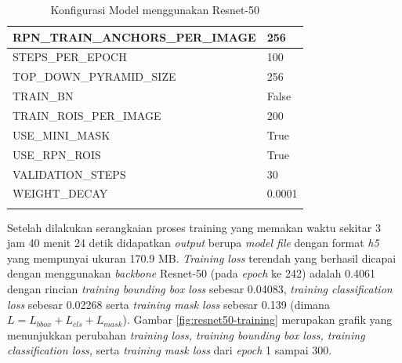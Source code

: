 \begin{longtable}[h]{|l|l|}
		RPN\_TRAIN\_ANCHORS\_PER\_IMAGE & 256                                                                                                                                                                                    \\ \hline
		STEPS\_PER\_EPOCH               & 100                                                                                                                                                                                    \\ \hline
		TOP\_DOWN\_PYRAMID\_SIZE        & 256                                                                                                                                                                                    \\ \hline
		TRAIN\_BN                       & False                                                                                                                                                                                  \\ \hline
		TRAIN\_ROIS\_PER\_IMAGE         & 200                                                                                                                                                                                    \\ \hline
		USE\_MINI\_MASK                 & True                                                                                                                                                                                   \\ \hline
		USE\_RPN\_ROIS                  & True                                                                                                                                                                                   \\ \hline
		VALIDATION\_STEPS               & 30                                                                                                                                                                                     \\ \hline
		WEIGHT\_DECAY                   & 0.0001  
		\\ \hline 
	\caption{Konfigurasi Model menggunakan Resnet-50 }
	\label{tab:conf-resnet50}
\end{longtable}

Setelah dilakukan serangkaian proses training yang memakan waktu sekitar 3 jam 40 menit 24 detik didapatkan \textit{output} berupa \textit{model file}  dengan format \textit{h5} yang mempunyai ukuran 170.9 MB. \textit{Training loss} terendah yang berhasil dicapai dengan menggunakan \textit{backbone} Resnet-50 (pada \textit{epoch} ke 242) adalah 0.4061 dengan rincian \textit{training bounding box loss} sebesar 0.04083, \textit{training classification loss} sebesar 0.02268 serta \textit{training mask loss} sebesar 0.139 (dimana $L=L_{bbox}+L_{cls}+L_{mask}$). Gambar \ref{fig:resnet50-training} merupakan grafik yang menunjukkan perubahan \textit{training loss, training bounding box loss, training classification loss,} serta \textit{training mask loss} dari \textit{epoch} 1 sampai 300.


